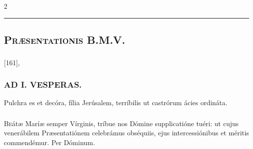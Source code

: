 \documentclass[9pt,twoside]{extarticle}
\begin{document}
\begin{multicols}{2}
\begin{center}\textcolor{red}{\rule{\linewidth}{0.5pt}} \end{center}

\subsection*{\center \textsc{}}
\subsubsection*{\center {}}
\subsection*{\center \textsc{Præsentationis B.M.V.}}
\subsubsection*{\center {}}
\begin{tightlist}{}
\item {} [161], 
\end{tightlist}
\subsubsection*{\center \textsc{AD I. VESPERAS.}}
\begin{tightlist}{}
\item {} Pulchra es et decóra, fília Jerúsalem, terríbilis ut castrórum ácies ordináta. 
\end{tightlist}
\subsubsection*{\center {}}
\lettrine{B}eátæ Maríæ semper Vírginis, tríbue nos Dómine supplicatióne tuéri: ut cujus venerábilem Præsentatiónem celebrámus obséquiis, ejus intercessiónibus et méritis commendémur. Per Dóminum.




\end{multicols}
\end{document}
